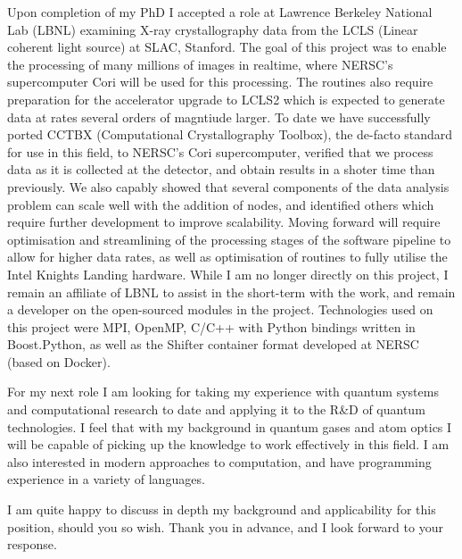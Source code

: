 \documentclass[11pt,letter,unicode]{moderncv}
\begin{document}
{Upon completion of my PhD I accepted a role at Lawrence Berkeley National Lab (LBNL) examining X-ray crystallography data from the LCLS (Linear coherent light source) at SLAC, Stanford. The goal of this project was to enable the processing of many millions of images in realtime, where NERSC’s supercomputer Cori will be used for this processing. The routines also require preparation for the accelerator upgrade to LCLS2 which is expected to generate data at rates several orders of magntiude larger. To date we have successfully ported CCTBX (Computational Crystallography Toolbox), the de-facto standard for use in this field, to NERSC's Cori supercomputer, verified that we process data as it is collected at the detector, and obtain results in a shoter time than previously. We also capably showed that several components of the data analysis problem can scale well with the addition of nodes, and identified others which require further development to improve scalability. Moving forward will require optimisation and streamlining of the processing stages of the software pipeline to allow for higher data rates, as well as optimisation of routines to fully utilise the Intel Knights Landing hardware. While I am no longer directly on this project, I remain an affiliate of LBNL to assist in the short-term with the work, and remain a developer on the open-sourced modules in the project. Technologies used on this project were MPI, OpenMP, C/C++ with Python bindings written in Boost.Python, as well as the Shifter container format developed at NERSC (based on Docker).

    For my next role I am looking for taking my experience with quantum systems and computational research to date and applying it to the R\&D of quantum technologies. I feel that with my background in quantum gases and atom optics I will be capable of picking up the knowledge to work effectively in this field. I am also interested in modern approaches to computation, and have programming experience in a variety of languages.

I am quite happy to discuss in depth my background and applicability for this position, should you so wish. Thank you in advance, and I look forward to your response.


}
\end{document}
